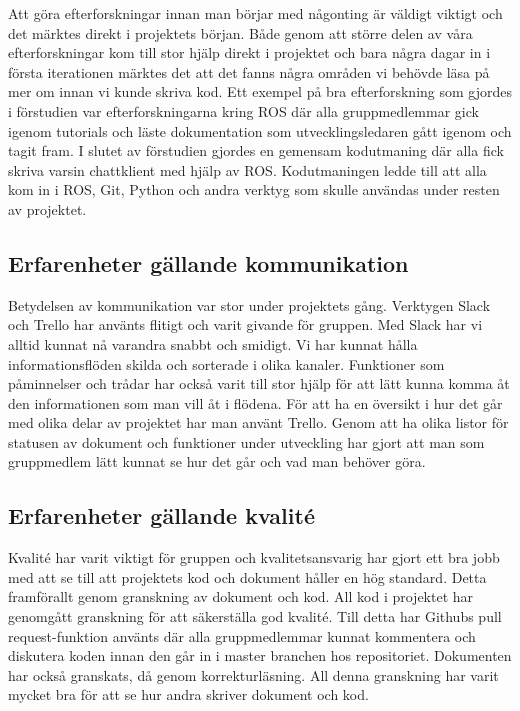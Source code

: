 Att göra efterforskningar innan man börjar med någonting är väldigt viktigt och det märktes direkt i projektets början. Både genom att större delen av våra efterforskningar kom till stor hjälp direkt i projektet och bara några dagar in i första iterationen märktes det att det fanns några områden vi behövde läsa på mer om innan vi kunde skriva kod. Ett exempel på bra efterforskning som gjordes i förstudien var efterforskningarna kring ROS där alla gruppmedlemmar gick igenom tutorials och läste dokumentation som utvecklingsledaren gått igenom och tagit fram. I slutet av förstudien gjordes en gemensam kodutmaning där alla fick skriva varsin chattklient med hjälp av ROS. Kodutmaningen ledde till att alla kom in i ROS, Git, Python och andra verktyg som skulle användas under resten av projektet.


\subsection{Erfarenheter gällande kommunikation}

Betydelsen av kommunikation var stor under projektets gång. Verktygen Slack och Trello har använts flitigt och varit givande för gruppen. Med Slack har vi alltid kunnat nå varandra snabbt och smidigt. Vi har kunnat hålla informationsflöden skilda och sorterade i olika kanaler. Funktioner som påminnelser och trådar har också varit till stor hjälp för att lätt kunna komma åt den informationen som man vill åt i flödena. För att ha en översikt i hur det går med olika delar av projektet har man använt Trello. Genom att ha olika listor för statusen av dokument och funktioner under utveckling har gjort att man som gruppmedlem lätt kunnat se hur det går och vad man behöver göra. 


\subsection{Erfarenheter gällande kvalité}

Kvalité har varit viktigt för gruppen och kvalitetsansvarig har gjort ett bra jobb med att se till att projektets kod och dokument håller en hög standard. Detta framförallt genom granskning av dokument och kod. All kod i projektet har genomgått granskning för att säkerställa god kvalité. Till detta har Githubs pull request-funktion använts där alla gruppmedlemmar kunnat kommentera och diskutera koden innan den går in i master branchen hos repositoriet. Dokumenten har också granskats, då genom korrekturläsning. All denna granskning har varit mycket bra för att se hur andra skriver dokument och kod.

